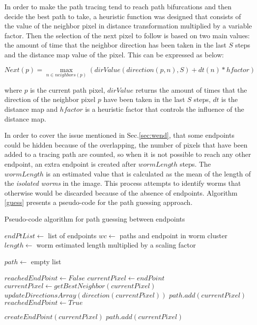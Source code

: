 In order to make the path tracing tend to reach path bifurcations and then decide the best
path to take, a heuristic function was designed that consists of the value of the neighbor pixel
in distance transformation multiplied by a variable factor.
Then the selection of the next pixel to follow is based on two main values:
the amount of time that the neighbor direction has been taken in the last $S$ steps and
the distance map value of the pixel. This can be expressed as below:

$$Next(p) = \max_{n \in neighbors(p)} (dirValue(direction(p,n),S) + dt(n)*hfactor)$$

where $p$ is the current path pixel, $dirValue$ returns the amount of times that the 
direction of the neighbor pixel $p$ have been taken in the last $S$ steps, $dt$ is the 
distance map and $hfactor$ is a heuristic factor that controls the influence of the
distance map.

In order to cover the issue mentioned in Sec.\ref{sec:wend}, that some endpoints could
be hidden because of the overlapping, the number of pixels that have been added
to a tracing path are counted, so when it is not possible to reach any other endpoint,
an extra endpoint is created after $wormLength$ steps. 
The $wormLength$ is an estimated value that is calculated
as the mean of the length of the \emph{isolated worms} in the image. This process
attempts to identify worms that otherwise would be discarded because of the absence
of endpoints. Algorithm \ref{guess} presents a pseudo-code for the path
guessing approach.

\begin{algorithm}                     
\caption{Pseudo-code algorithm for path guessing between endpoints}         
\label{guess}                    
\begin{algorithmic}                   

\STATE $endPtList \leftarrow$ list of endpoints
\STATE $wc \leftarrow$ paths and endpoint in worm cluster 
\STATE $length \leftarrow$ worm estimated length multiplied by a scaling factor
\STATE {}
\ENDIF
{}

\STATE $path \leftarrow$ empty list

\STATE $reachedEndPoint \leftarrow False$
\STATE $currentPixel \leftarrow endPoint$
\STATE $currentPixel \leftarrow getBestNeighbor(currentPixel)$
\STATE $updateDirectionsArray(direction(currentPixel))$
\STATE $path.add(currentPixel)$
\STATE $reachedEndPoint \leftarrow True$
\ENDIF
\ENDWHILE 

\STATE $createEndPoint(currentPixel)$
\STATE $path.add(currentPixel)$
\ELSE
\STATE {}
\ENDIF
\ENDIF
\ENDFOR

\end{algorithmic}
\end{algorithm}

